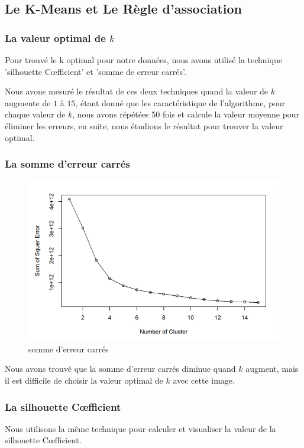 \subsection{Le K-Means et Le Règle d'association }
\subsubsection{La valeur optimal de $k$}
Pour trouvé le k optimal pour notre données, nous avons utilisé la technique 'silhouette C\oe fficient' et 'somme de erreur carrés'.

Nous avons mesuré le résultat de ces deux techniques quand la valeur de $k$ augmente de $1$ à $15$, étant donné que les caractéristique de l'algorithme, pour chaque valeur de $k$, nous avons répétées 50 fois et calcule la valeur moyenne pour éliminer les erreurs, en suite, nous étudions le résultat pour trouver la valeur optimal.
\subsubsection*{La somme d'erreur carrés}
\begin{figure}[H]
\centering
\includegraphics[width=0.8\linewidth]{images/sse}
\caption{somme d'erreur carrés}
\label{fig:sse}
\end{figure}
Nous avons trouvé que la somme d'erreur carrés diminue quand $k$ augment, mais il est difficile de choisir la valeur optimal de $k$ avec cette image.

\subsubsection*{La silhouette C\oe fficient}
Nous utilisons la même technique pour calculer et visualiser la valeur de la silhouette C\oe fficient.

